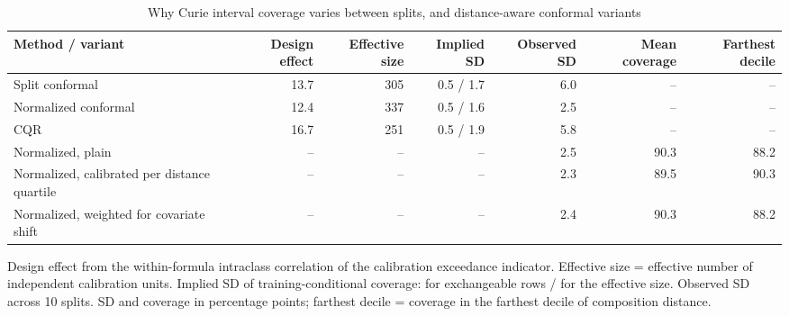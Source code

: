 \begin{table}
\caption{Why Curie interval coverage varies between splits, and distance-aware conformal variants}
\label{tab:tableS6_design_effect_distance_conformal}
\tablefont
\begin{tabularx}{\textwidth}{@{}>{\raggedright\arraybackslash}Xrrrrrr@{}}
\toprule
\textbf{Method / variant} & \textbf{Design effect} & \textbf{Effective size} & \textbf{Implied SD} & \textbf{Observed SD} & \textbf{Mean coverage} & \textbf{Farthest decile} \\
\midrule
Split conformal & 13.7 & 305 & 0.5 / 1.7 & 6.0 & -- & -- \\
Normalized conformal & 12.4 & 337 & 0.5 / 1.6 & 2.5 & -- & -- \\
CQR & 16.7 & 251 & 0.5 / 1.9 & 5.8 & -- & -- \\
Normalized, plain & -- & -- & -- & 2.5 & 90.3 & 88.2 \\
Normalized, calibrated per distance quartile & -- & -- & -- & 2.3 & 89.5 & 90.3 \\
Normalized, weighted for covariate shift & -- & -- & -- & 2.4 & 90.3 & 88.2 \\
\bottomrule
\end{tabularx}
\par\vspace{4pt}\raggedright\noindent Design effect from the within-formula intraclass correlation of the calibration exceedance indicator. Effective size = effective number of independent calibration units. Implied SD of training-conditional coverage: for exchangeable rows / for the effective size. Observed SD across 10 splits. SD and coverage in percentage points; farthest decile = coverage in the farthest decile of composition distance.
\end{table}

